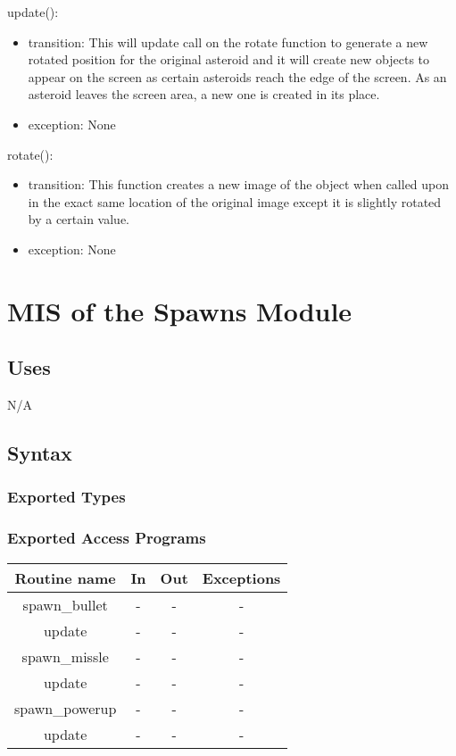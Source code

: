 \documentclass[12pt, titlepage]{article}
\begin{document}
\noindent update():
\begin{itemize}
\item transition: This will update call on the rotate function to generate a new rotated position for the original asteroid and it will create new objects to appear on the screen as certain asteroids reach the edge of the screen. As an asteroid leaves the screen area, a new one is created in its place.
\item exception: None
\end{itemize}

\noindent rotate():
\begin{itemize}
\item transition: This function creates a new image of the object when called upon in the exact same location of the original image except it is slightly rotated by a certain value. 
\item exception: None
\end{itemize}

\newpage

\section {MIS of the Spawns Module}

\subsection {Uses}

N/A

\subsection {Syntax}

\subsubsection {Exported Types}

\subsubsection {Exported Access Programs}

\begin{tabular}{| c | c | c | c |}
\hline
\textbf{Routine name} & \textbf{In} & \textbf{Out} & \textbf{Exceptions}\\
\hline
spawn\_bullet & - &  - & -  \\
\hline
update & - &  - & -  \\
\hline
spawn\_missle & -  & - & -\\
\hline
update & - &  - & -  \\
\hline
spawn\_powerup& - & - & -\\
\hline
update & - &  - & -  \\
\hline
\end{tabular}
\end{document}
